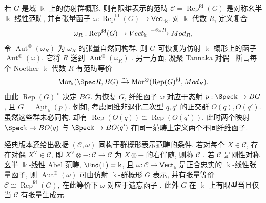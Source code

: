 \begin{remark}\label{src:7.6.4}
若 $G$ 是域 $\Bbbk$ 上的仿射群概形, 则有限维表示的范畴 $\mathcal C=\operatorname{Rep}^{\mathrm{fd}}(G)$ 是对称幺半 $\Bbbk$-线性范畴, 并有张量函子 $\omega:\operatorname{Rep}^{\mathrm{fd}}(G)\to\mathsf{Vect}_{\Bbbk}$. 对 $\Bbbk$-代数 $R$, 定义复合
\begin{align*}
\omega_R:\operatorname{Rep}^{\mathrm{fd}}(G)\to Vect_{\Bbbk}\xrightarrow{-\otimes_{\Bbbk}R}Mod_R,
\end{align*}
令 $\operatorname{Aut}^{\otimes}(\omega_R)$ 为 $\omega_R$ 的张量自然同构群. 则 $G$ 可恢复为仿射 $\Bbbk$-概形上的函子 $\underline{\operatorname{Aut}}^{\otimes}(\omega)$, 它将 $R$ 送到 $\operatorname{Aut}^{\otimes}(\omega_R)$ \cite[II.2.8]{DMOS82}. 另一方面, 凝聚 Tannaka 对偶~ 断言每个 Noether $\Bbbk$-代数 $R$ 有范畴等价
\begin{align*}
\operatorname{Mor}_{\Bbbk}(\Spec R,BG)\xrightarrow{\sim}\operatorname{Mor}^{\otimes}(\operatorname{Rep}(G)^{\mathrm{fd}},\Mod_R).
\end{align*}
由此 $\operatorname{Rep}(G)^{\mathrm{fd}}$ 决定 $BG$. 为恢复 $G$, 纤维函子 $\omega$ 对应于态射 $p:\Spec\Bbbk\to BG$, 且 $G=\underline{\operatorname{Aut}}_{\Bbbk}(p)$. 例如, 考虑同维非退化二次型 $q,q'$ 的正交群 $O(q),O(q')$. 虽然这些群未必同构, 却有 $\operatorname{Rep}(O(q))\cong\operatorname{Rep}(O(q'))$. 此时两个映射 $\Spec\Bbbk\to BO(q)$ 与 $\Spec\Bbbk\to BO(q')$ 在同一范畴上定义两个不同纤维函子.

经典版本还给出数据 $(\mathcal C,\omega)$ 同构于群概形表示范畴的条件. 若对每个 $X\in\mathcal C$, 存在对偶 $X^\vee\in\mathcal C$, 即 $X^\vee\otimes-:\mathcal C\to\mathcal C$ 为 $X\otimes-$ 的右伴随, 则称 $\mathcal C$ . 若 $\mathcal C$ 是刚性对称幺半 $\Bbbk$-线性 Abel 范畴, $\End(1)=\Bbbk$, 且 $\omega:\mathcal C\to\mathsf{Vect}_{\Bbbk}$ 是正合忠实的 $\Bbbk$-线性张量函子, 则 $\operatorname{Aut}^{\otimes}(\omega)$ 可由仿射 $\Bbbk$-群概形 $G$ 表示, 并有张量等价 $\mathcal C\cong\operatorname{Rep}^{\mathrm{fd}}(G)$, 在此等价下 $\omega$ 对应于遗忘函子 \cite[II.2.11]{DMOS82}. 此外 $G$ 在 $\Bbbk$ 上有限型当且仅当 $\mathcal C$ 有张量生成元.
\end{remark}

